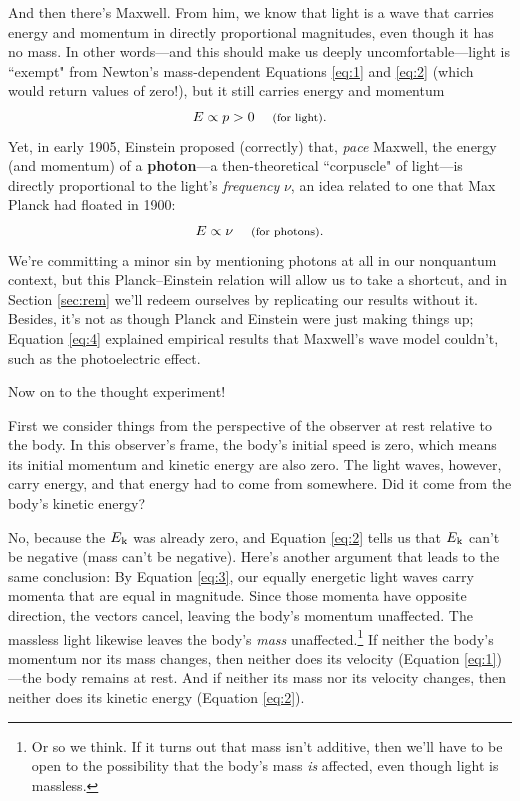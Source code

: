 \documentclass[12pt]{article}
\begin{document}
And then there's Maxwell. From him, we know that light is a wave that carries energy and momentum in directly proportional magnitudes, even though it has no mass. In other words---and this should make us deeply uncomfortable---light is ``exempt" from Newton's mass-dependent Equations \ref{eq:1} and \ref{eq:2} (which would return values of zero!), but it still carries energy and momentum
\begin{equation}\label{eq:3}
E \propto p >0 \quad \text{\footnotesize{ (for light)}} .
\end{equation}
Yet, in early 1905, Einstein proposed (correctly) that, \emph{pace} Maxwell, the energy (and momentum) of a \textbf{photon}---a then-theoretical ``corpuscle" of light---is directly proportional to the light's \emph{frequency} $\nu$, an idea related to one that Max Planck had floated in 1900:
\begin{equation}\label{eq:4}
E \propto \nu \quad \text{\footnotesize{ (for photons)}}.
\end{equation}
We're committing a minor sin by mentioning photons at all in our nonquantum context, but this Planck--Einstein relation will allow us to take a shortcut, and in Section \ref{sec:rem} we'll redeem ourselves by replicating our results without it. Besides, it's not as though Planck and Einstein were just making things up; Equation \ref{eq:4} explained empirical results that Maxwell's wave model couldn't, such as the photoelectric effect.

Now on to the thought experiment!

First we consider things from the perspective of the observer at rest relative to the body. In this observer's frame, the body's initial speed is zero, which means its initial momentum and kinetic energy are also zero. The light waves, however, carry energy, and that energy had to come from somewhere. Did it come from the body's kinetic energy?

No, because the $E_{\mkern.5mu \textrm{k}}$ was already zero, and Equation \ref{eq:2} tells us that $E_{\mkern.5mu \textrm{k}}$ can't be negative (mass can't be negative). Here's another argument that leads to the same conclusion: By Equation \ref{eq:3}, our equally energetic light waves carry momenta that are equal in magnitude. Since those momenta have opposite direction, the vectors cancel, leaving the body's momentum unaffected. The massless light likewise leaves the body's \emph{mass} unaffected.\footnote{\label{fn:ma}Or so we think. If it turns out that mass isn't additive, then we'll have to be open to the possibility that the body's mass \emph{is} affected, even though light is massless.} If neither the body's momentum nor its mass changes, then neither does its velocity (Equation \ref{eq:1})---the body remains at rest. And if neither its mass nor its velocity changes, then neither does its kinetic energy (Equation \ref{eq:2}).
\end{document}
